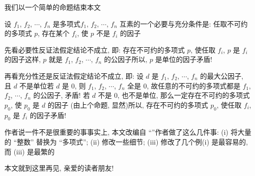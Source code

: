 我们以一个简单的命题结束本文\period

\begin{proposition}
    设 $f_1$, $f_2$, $\cdots$, $f_n$ 是多项式\period $f_1$, $f_2$, $\cdots$, $f_n$ 互素的一个必要与充分条件是: 任取不可约的多项式 $p$, 存在某个 $f_i$, 使 $p$ 不是 $f_i$ 的因子\period
\end{proposition}

\begin{pf}
    先看必要性\period 反证法\period 假定结论不成立, 即: 存在不可约的多项式 $p$, 使任取 $f_i$, $p$ 是 $f_i$ 的因子\period 这样, $p$ 就是 $f_1$, $f_2$, $\cdots$, $f_n$ 的公因子\period 所以, $p$ 是单位的因子\period 矛盾!

    再看充分性\period 还是反证法\period 假定结论不成立, 即: 设 $d$ 是 $f_1$, $f_2$, $\cdots$, $f_n$ 的最大公因子, 且 $d$ 不是单位\period 若 $d$ 是 $0$, 则 $f_1$, $f_2$, $\cdots$, $f_n$ 全是 $0$, 故任意的不可约的多项式都是 $f_1$, $f_2$, $\cdots$, $f_n$ 的公因子, 矛盾! 若 $d$ 不是 $0$, 也不是单位, 那么一定存在不可约的多项式 $p_0$, 使 $p_0$ 是 $d$ 的因子 (由上个命题, 显然)\period 所以, 存在不可约的多项式 $p_0$, 使任取 $f_i$, $p_0$ 是 $f_i$ 的因子\period 矛盾!
\end{pf}

\begin{remark}
    作者说一件不是很重要的事\period 事实上, 本文改编自 ``\SomePropertiesOfIntegers ''\period 作者做了这么几件事: (i) 将大量的 ``整数'' 替换为 ``多项式''; (ii) 修改一些细节; (iii) 修改了几个例\period (i) 是最容易的, 而 (iii) 是最繁的\period
\end{remark}

本文就到这里\period 再见, 亲爱的读者朋友!

